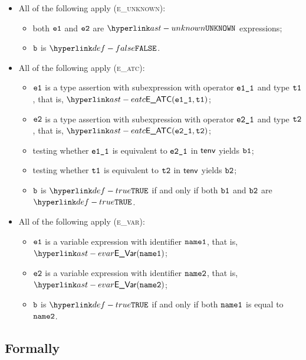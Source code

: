 \begin{itemize}
  \item All of the following apply (\textsc{e\_unknown}):
  \begin{itemize}
    \item both $\veone$ and $\vetwo$ are $\UNKNOWN$ expressions;
    \item $\vb$ is $\False$.
  \end{itemize}

  \item All of the following apply (\textsc{e\_atc}):
  \begin{itemize}
    \item $\veone$ is a type assertion with subexpression with operator $\veoneone$ and type $\vtone$,
          that is, $\EATC(\veoneone, \vtone)$;
    \item $\vetwo$ is a type assertion with subexpression with operator $\vetwoone$ and type $\vttwo$,
          that is, $\EATC(\vetwoone, \vttwo)$;
    \item testing whether $\veoneone$ is equivalent to $\vetwoone$ in $\tenv$ yields $\vbone$;
    \item testing whether $\vtone$ is equivalent to $\vttwo$ in $\tenv$ yields $\vbtwo$;
    \item $\vb$ is $\True$ if and only if both $\vbone$ and $\vbtwo$ are $\True$.
  \end{itemize}

  \item All of the following apply (\textsc{e\_var}):
  \begin{itemize}
    \item $\veone$ is a variable expression with identifier $\nameone$, that is, $\EVar(\nameone)$;
    \item $\vetwo$ is a variable expression with identifier $\nametwo$, that is, $\EVar(\nametwo)$;
    \item $\vb$ is $\True$ if and only if both $\nameone$ is equal to $\nametwo$.
  \end{itemize}
\end{itemize}

\subsection{Formally}
\begin{mathpar}
\end{mathpar}

